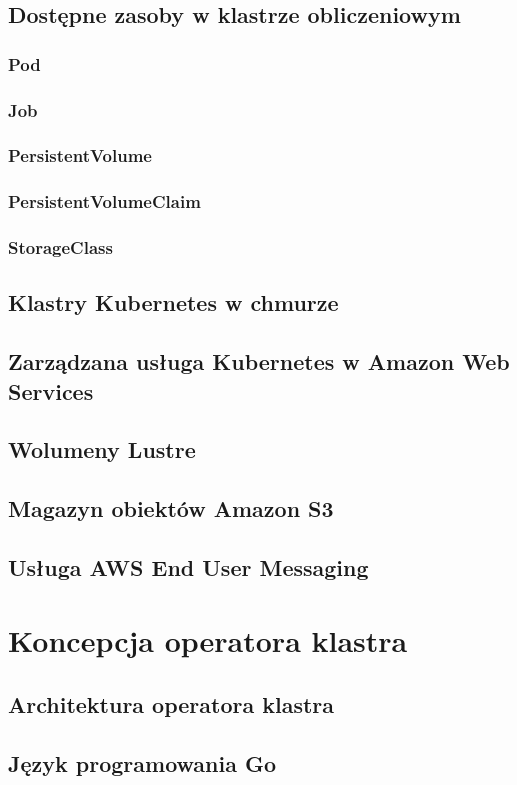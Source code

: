 \subsection{Dostępne zasoby w klastrze obliczeniowym}

\subsubsection{Pod}

\subsubsection{Job}

\subsubsection{PersistentVolume}

\subsubsection{PersistentVolumeClaim}

\subsubsection{StorageClass}

\subsection{Klastry Kubernetes w chmurze}

\subsection{Zarządzana usługa Kubernetes w Amazon Web Services}

\subsection{Wolumeny Lustre}

\subsection{Magazyn obiektów Amazon S3}

\subsection{Usługa AWS End User Messaging}


\section{Koncepcja operatora klastra}

\subsection{Architektura operatora klastra}

\subsection{Język programowania Go}
